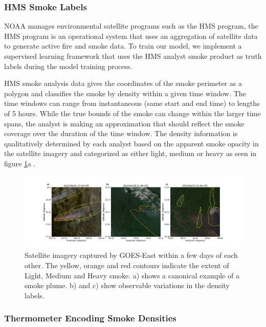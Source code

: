 \documentclass{article}
\begin{document}
\subsubsection*{HMS Smoke Labels} 
NOAA manages environmental satellite programs such as the HMS program, the HMS program is an operational system that uses an aggregation of satellite data to generate active fire and smoke data. To train our model, we implement a supervised learning framework that uses the HMS analyst smoke product as truth labels during the model training process.

HMS smoke analysis data gives the coordinates of the smoke perimeter as a polygon and classifies the smoke by density within a given time window. The time windows can range from instantaneous (same start and end time) to lengths of 5 hours. While the true bounds of the smoke can change within the larger time spans, the analyst is making an approximation that should reflect the smoke coverage over the duration of the time window. The density information is qualitatively determined by each analyst based on the apparent smoke opacity in the satellite imagery and categorized as either light, medium or heavy as seen in figure \ref{densities}a \cite{hms_web}.

\begin{figure}
    \centering
    \includegraphics[width=14cm]{figures/Misclassified.png}
    \caption{Satellite imagery captured by GOES-East within a few days of each other. The yellow, orange and red contours indicate the extent of Light, Medium and Heavy smoke. a) shows a canonical example of a smoke plume. b) and c) show observable variations in the density labels.}\label{densities}
\end{figure}

\subsubsection*{Thermometer Encoding Smoke Densities}
\end{document}
